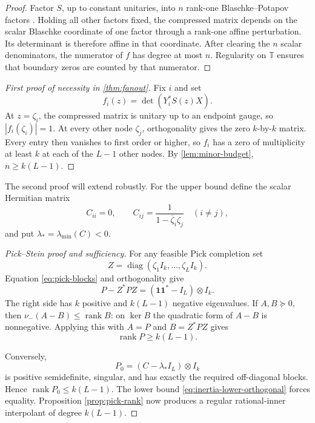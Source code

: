 \documentclass[11pt]{article}
\theoremstyle{definition}
\theoremstyle{remark}
\newcommand{\T}{\mathbb T}
\newcommand{\rank}{\operatorname{rank}}
\newcommand{\diag}{\operatorname{diag}}
\newcommand{\nminus}{\nu_{-}}
\begin{document}
\begin{proof}
Factor $S$, up to constant unitaries, into $n$ rank-one
Blaschke--Potapov factors \cite{Potapov1955,AlpayJorgensenLewkowicz2016}.
Holding all other factors fixed, the compressed matrix depends on the scalar
Blaschke coordinate of one factor through a rank-one affine perturbation.
Its determinant is therefore affine in that coordinate.  After clearing the
$n$ scalar denominators, the numerator of $f$ has degree at most $n$.
Regularity on $\T$ ensures that boundary zeros are counted by that numerator.
\end{proof}

\begin{proof}[First proof of necessity in \cref{thm:fanout}]
Fix $i$ and set
\[
                       f_i(z)=\det(Y_i^*S(z)X).
\]
At $z=\zeta_i$, the compressed matrix is unitary up to an endpoint gauge, so
$|f_i(\zeta_i)|=1$.  At every other node $\zeta_j$, orthogonality gives the
zero $k$-by-$k$ matrix.  Every entry then vanishes to first order or higher,
so $f_i$ has a zero of multiplicity at least $k$ at each of the $L-1$ other
nodes.  By \cref{lem:minor-budget}, $n\ge k(L-1)$.
\end{proof}

The second proof will extend robustly.  For the upper bound define the scalar
Hermitian matrix
\begin{equation}\label{eq:Cmatrix}
 C_{ii}=0,
 \qquad
 C_{ij}=\frac{1}{1-\overline\zeta_i\zeta_j}\quad(i\ne j),
\end{equation}
and put $\lambda_*=\lambda_{\min}(C)<0$.

\begin{proof}[Pick--Stein proof and sufficiency]
For any feasible Pick completion set
\[
 Z=\diag(\zeta_1I_k,\ldots,\zeta_LI_k).
\]
Equation \eqref{eq:pick-blocks} and orthogonality give
\begin{equation}\label{eq:orthogonal-stein}
 P-Z^*PZ=(\mathbf1\mathbf1^*-I_L)\otimes I_k.
\end{equation}
The right side has $k$ positive and $k(L-1)$ negative eigenvalues.  If
$A,B\succeq0$, then $\nminus(A-B)\le\rank B$: on $\ker B$ the quadratic
form of $A-B$ is nonnegative.  Applying this with $A=P$ and $B=Z^*PZ$
gives
\begin{equation}\label{eq:inertia-lower-orthogonal}
                       \rank P\ge k(L-1).
\end{equation}

Conversely,
\begin{equation}\label{eq:canonical-completion}
                 P_0=(C-\lambda_*I_L)\otimes I_k
\end{equation}
is positive semidefinite, singular, and has exactly the required
off-diagonal blocks.  Hence $\rank P_0\le k(L-1)$.  The lower bound
\eqref{eq:inertia-lower-orthogonal} forces equality.  Proposition
\ref{prop:pick-rank} now produces a regular rational-inner interpolant of
degree $k(L-1)$.
\end{proof}
\end{document}
